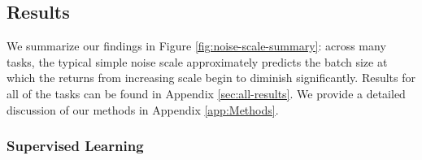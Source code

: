 \documentclass[english]{article}
\begin{document}
\subsection{Results}

We summarize our findings in Figure \ref{fig:noise-scale-summary}: across many tasks, the typical simple noise scale approximately predicts the batch size at which the returns from increasing scale begin to diminish significantly.   Results for all of the tasks can be found in Appendix \ref{sec:all-results}.  We provide a detailed discussion of our methods in Appendix \ref{app:Methods}.  

\subsubsection*{Supervised Learning}
\end{document}

